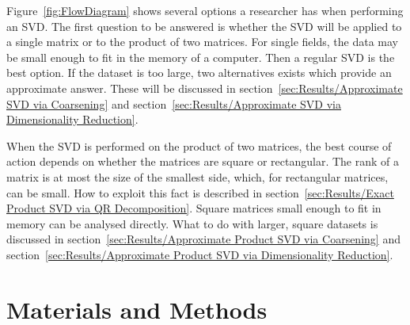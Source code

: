 \documentclass[ijgi,article,submit,moreauthors,pdftex,10pt,a4paper]{Definitions/mdpi}
\begin{document}
Figure~\ref{fig:FlowDiagram} shows several options a researcher has when performing an SVD. The first question to be answered is whether the SVD will be applied to a single matrix or to the product of two matrices. For single fields, the data may be small enough to fit in the memory of a computer. Then a regular SVD is the best option. If the dataset is too large, two alternatives exists which provide an approximate answer. These will be discussed in section~\ref{sec:Results/Approximate SVD via Coarsening} and section~\ref{sec:Results/Approximate SVD via Dimensionality Reduction}.

When the SVD is performed on the product of two matrices, the best course of action depends on whether the matrices are square or rectangular. The rank of a matrix is at most the size of the smallest side, which, for rectangular matrices, can be small. How to exploit this fact is described in section~\ref{sec:Results/Exact Product SVD via QR Decomposition}. Square matrices small enough to fit in memory can be analysed directly. What to do with larger, square datasets is discussed in section~\ref{sec:Results/Approximate Product SVD via Coarsening} and section~\ref{sec:Results/Approximate Product SVD via Dimensionality Reduction}.

\section{Materials and Methods}
\label{sec:Materials and Methods}


\end{document}
